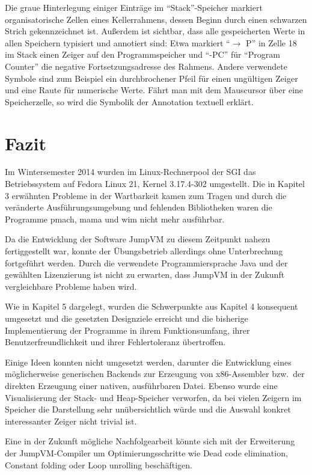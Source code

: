 \documentclass[german, a4paper, parskip, bibliography=totoc]{scrartcl}
\begin{document}
Die graue Hinterlegung einiger Einträge im \enquote{Stack}-Speicher markiert
organisatorische Zellen eines Kellerrahmens, dessen Beginn durch einen
schwarzen Strich gekennzeichnet ist. Außerdem ist sichtbar, dass alle
gespeicherten Werte in allen Speichern typisiert und annotiert sind: Etwa
markiert \enquote{$\rightarrow$ P} in Zelle 18 im Stack einen Zeiger auf den
Programmspeicher und \enquote{-PC} für \enquote{Program Counter}
die negative Fortsetzungsadresse des Rahmens. Andere verwendete Symbole sind
zum Beispiel ein durchbrochener Pfeil für einen ungültigen Zeiger und eine Raute für
numerische Werte. Fährt man mit dem Mauscursor über eine Speicherzelle, so wird
die Symbolik der Annotation textuell erklärt.


\section{Fazit}
Im Wintersemester 2014 wurden im Linux-Rechnerpool der SGI das Betriebssystem
auf Fedora Linux 21, Kernel 3.17.4-302 umgestellt. Die in Kapitel 3 erwähnten
Probleme in der Wartbarkeit kamen zum Tragen und durch die veränderte
Ausführungsumgebung und fehlenden Bibliotheken waren die Programme
pmach, mama und wim nicht mehr ausführbar.

Da die Entwicklung der Software JumpVM zu diesem Zeitpunkt nahezu
fertiggestellt war, konnte der Übungsbetrieb allerdings ohne Unterbrechung
fortgeführt werden. Durch die verwendete Programmiersprache Java und der
gewählten Lizenzierung ist nicht zu erwarten, dass JumpVM in der Zukunft
vergleichbare Probleme haben wird.

Wie in Kapitel 5 dargelegt, wurden die Schwerpunkte aus Kapitel 4 konsequent
umgesetzt und die gesetzten Designziele erreicht und die bisherige
Implementierung der Programme in ihrem Funktionsumfang, ihrer
Benutzerfreundlichkeit und ihrer Fehlertoleranz übertroffen.

Einige Ideen konnten nicht umgesetzt werden, darunter die Entwicklung eines
möglicherweise generischen Backends zur Erzeugung von x86-Assembler bzw.\ der
direkten Erzeugung einer nativen, ausführbaren Datei. Ebenso wurde eine
Visualisierung der Stack- und Heap-Speicher verworfen, da bei vielen Zeigern im
Speicher die Darstellung sehr unübersichtlich würde und die Auswahl konkret
interessanter Zeiger nicht trivial ist.

Eine in der Zukunft mögliche Nachfolgearbeit könnte sich mit der Erweiterung
der JumpVM-Compiler um Optimierungsschritte wie Dead code elimination, Constant
folding oder Loop unrolling beschäftigen.


\clearpage{}
\printbibliography{}
\end{document}
